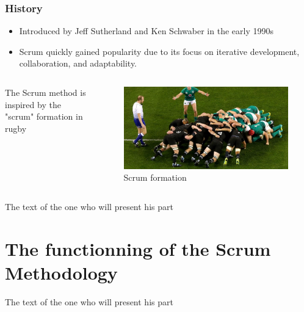 \documentclass[
	11pt, %
]{beamer}
\begin{document}
\begin{frame}
	\frametitle{History}
	\begin{itemize}
		\item Introduced by Jeff Sutherland and Ken Schwaber  in the early 1990s
		\item  Scrum quickly gained popularity due to its focus on iterative development, collaboration, and adaptability.
	\end{itemize}
	\begin{columns}[c] %
		\begin{column}{0.45\textwidth} %
			The Scrum method is inspired by the "scrum" formation in rugby
		\end{column}
		\begin{column}{0.5\textwidth} %
			\begin{figure}
				\includegraphics[width=0.8\linewidth]{scrum.jpg}
				\caption{Scrum formation}
			\end{figure}
		\end{column}
	\end{columns}

\end{frame}


\begin{frame}

	The text of the one who will present his part
\end{frame}


\section{The functionning of the Scrum Methodology}


\begin{frame}
	The text of the one who will present his part

\end{frame}
\end{document}

